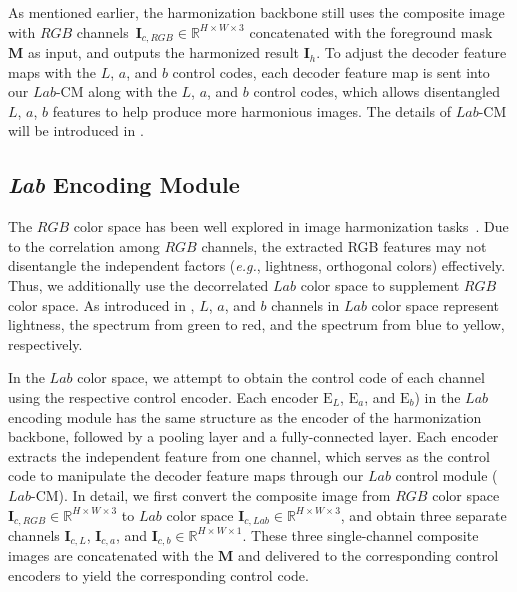 \documentclass[sigconf]{acmart}
\begin{document}
As mentioned earlier, the harmonization backbone still uses the composite image with $RGB$ channels~$\bm{I}_{c, \textit{RGB}} \in \mathbb{R}^{H \times W \times 3}$ concatenated with the foreground mask~$\bm{M}$ as input, and outputs the harmonized result $\bm{I}_{h}$.
To adjust the decoder feature maps with the $L$, $a$, and $b$ control codes, each decoder feature map is sent into our $Lab$-CM along with the $L$, $a$, and $b$ control codes, which allows disentangled $L$, $a$, $b$ features to help produce more harmonious images. 
The details of $Lab$-CM will be introduced in .

\subsection{\textit{Lab} Encoding Module}\label{Color Style Encoder}

The $RGB$ color space has been well explored in image harmonization tasks~\cite{dovenet, ssam, issam, intrinsic, IHT, rainnet, feature_mod, bargainnet, harmonizer, CDTNet}. Due to the correlation among $RGB$ channels, the extracted RGB features may not disentangle the independent factors (\emph{e.g.}, lightness, orthogonal colors) effectively. 
Thus, we additionally use the decorrelated $Lab$ color space to supplement $RGB$ color space. 
As introduced in , $L$, $a$, and $b$ channels in $Lab$ color space represent lightness, the spectrum from green to red, and the spectrum from blue to yellow, respectively.

In the $Lab$ color space, we attempt to obtain the control code of each channel using the respective control encoder. 
Each encoder $\text{E}_{\textit{L}}$, $\text{E}_{\textit{a}}$, and $\text{E}_{\textit{b}}$) in the $Lab$ encoding module has the same structure as the encoder of the harmonization backbone, followed by a pooling layer and a fully-connected layer. Each encoder extracts the independent feature from one channel, which serves as the control code to manipulate the decoder feature maps through our $Lab$ control module ($Lab$-CM).
In detail, we first convert the composite image from $RGB$ color space $\bm{I}_{c, RGB}\in\mathbb{R}^{H\times W\times 3}$ to $Lab$ color space $\bm{I}_{c, Lab}\in\mathbb{R}^{H\times W\times 3}$, and obtain three separate channels $\bm{I}_{c, \textit{L}}$, $\bm{I}_{c, \textit{a}}$, and $\bm{I}_{c, \textit{b}} \in\mathbb{R}^{H\times W\times 1}$. 
These three single-channel composite images are concatenated with the $\bm{M}$ and delivered to the corresponding control encoders to yield the corresponding control code.
\end{document}
